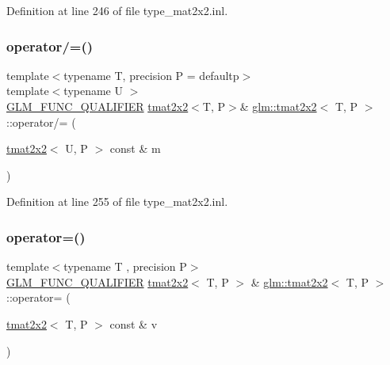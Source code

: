 Definition at line 246 of file type\+\_\+mat2x2.\+inl.

\mbox{\label{structglm_1_1tmat2x2_a3d12dbc4378d84707572ab61ae1b1b30}} 
\subsubsection{\texorpdfstring{operator/=()}{operator/=()}\hspace{0.1cm}{\footnotesize\ttfamily [4/4]}}
{\footnotesize\ttfamily template$<$typename T, precision P = defaultp$>$ \\
template$<$typename U $>$ \\
\mbox{\hyperlink{setup_8hpp_a33fdea6f91c5f834105f7415e2a64407}{G\+L\+M\+\_\+\+F\+U\+N\+C\+\_\+\+Q\+U\+A\+L\+I\+F\+I\+ER}} \mbox{\hyperlink{structglm_1_1tmat2x2}{tmat2x2}}$<$T, P$>$\& \mbox{\hyperlink{structglm_1_1tmat2x2}{glm\+::tmat2x2}}$<$ T, P $>$\+::operator/= (\begin{DoxyParamCaption}\item[{\mbox{\hyperlink{structglm_1_1tmat2x2}{tmat2x2}}$<$ U, P $>$ const \&}]{m }\end{DoxyParamCaption})}



Definition at line 255 of file type\+\_\+mat2x2.\+inl.

\mbox{\label{structglm_1_1tmat2x2_a1ac298c5914990ffb37bb71d462648e5}} 
\subsubsection{\texorpdfstring{operator=()}{operator=()}\hspace{0.1cm}{\footnotesize\ttfamily [1/3]}}
{\footnotesize\ttfamily template$<$typename T , precision P$>$ \\
\mbox{\hyperlink{setup_8hpp_a33fdea6f91c5f834105f7415e2a64407}{G\+L\+M\+\_\+\+F\+U\+N\+C\+\_\+\+Q\+U\+A\+L\+I\+F\+I\+ER}} \mbox{\hyperlink{structglm_1_1tmat2x2}{tmat2x2}}$<$ T, P $>$ \& \mbox{\hyperlink{structglm_1_1tmat2x2}{glm\+::tmat2x2}}$<$ T, P $>$\+::operator= (\begin{DoxyParamCaption}\item[{\mbox{\hyperlink{structglm_1_1tmat2x2}{tmat2x2}}$<$ T, P $>$ const \&}]{v }\end{DoxyParamCaption})}



